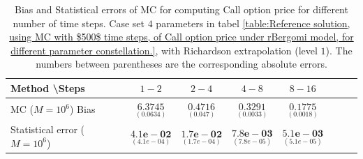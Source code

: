 \documentclass[11pt]{article}
\begin{document}
\begin{table}[h!]
\centering
\begin{tabular}{l*{6}{c}r}
Method \textbackslash  Steps            & $1-2$ & $2-4$ & $4-8$ & $8-16$  \\
\hline
MC  ($M=10^6$) Bias   &$\underset{(0.0634 )}{\mathbf{6.3745}}$  & $\underset{(0.047)}{\mathbf{0.4716}}$  & $\underset{( 0.0033 )}{\mathbf{0.3291}}$  & $\underset{( 0.0018)}{\mathbf{0.1775}}$ \\	

Statistical error ($M=10^6$)   & $\underset{(  4.1e-04)}{\mathbf{4.1e-02}}$  & $\underset{(1.7e-04 )}{\mathbf{1.7e-02}}$  & $\underset{(7.8e-05)}{\mathbf{7.8e-03}}$ & $\underset{(5.1e-05 )}{\mathbf{5.1e-03}}$ \\	

\hline
\end{tabular}
\caption{Bias and Statistical errors of MC   for computing Call option price  for different number of time steps. Case set $4$ parameters in tabel \ref{table:Reference solution, using MC with $500$ time steps, of Call option price under rBergomi model, for different parameter constellation.}, with Richardson extrapolation (level $1$). The numbers between parentheses are the corresponding absolute errors.}
\label{Bias and Statistical errors of MC ($M=10^6$)  for computing Call option price  for different number of time steps. Case set $4$ parameters, with Richardson extrapolation (level1). The numbers between parentheses are the corresponding absolute errors.}
\end{table}
\end{document}
